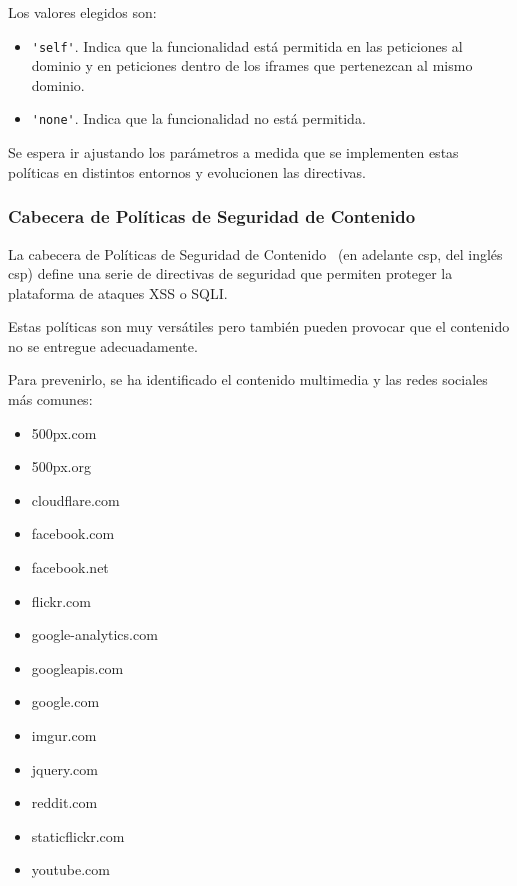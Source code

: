 \par Los valores elegidos son:
\begin{itemize}
  \item \lstinline{'self'}. Indica que la funcionalidad está permitida en las peticiones al dominio y en peticiones dentro de los iframes que pertenezcan al mismo dominio.
  \item \lstinline{'none'}. Indica que la funcionalidad no está permitida.
\end{itemize}

\par Se espera ir ajustando los parámetros a medida que se implementen estas políticas en distintos entornos y evolucionen las directivas.


\subsubsection{Cabecera de Políticas de Seguridad de Contenido}
\par La cabecera de Políticas de Seguridad de Contenido~\cite{csp} (en adelante \acrshort{csp}, del inglés \acrlong{csp}) define una serie de directivas de seguridad que permiten proteger la plataforma
de ataques \gls{XSS} o \gls{SQLI}.
\par Estas políticas son muy versátiles pero también pueden provocar que el contenido no se entregue adecuadamente.
\par Para prevenirlo, se ha identificado el contenido multimedia y las redes sociales más comunes:
\begin{multicols}{2}
\begin{itemize}
  \item 500px.com
  \item 500px.org
  \item cloudflare.com
  \item facebook.com
  \item facebook.net
  \item flickr.com
  \item google-analytics.com
  \item googleapis.com
  \item google.com
  \item imgur.com
  \item jquery.com
  \item reddit.com
  \item staticflickr.com
  \item youtube.com
\end{itemize}
\end{multicols}

